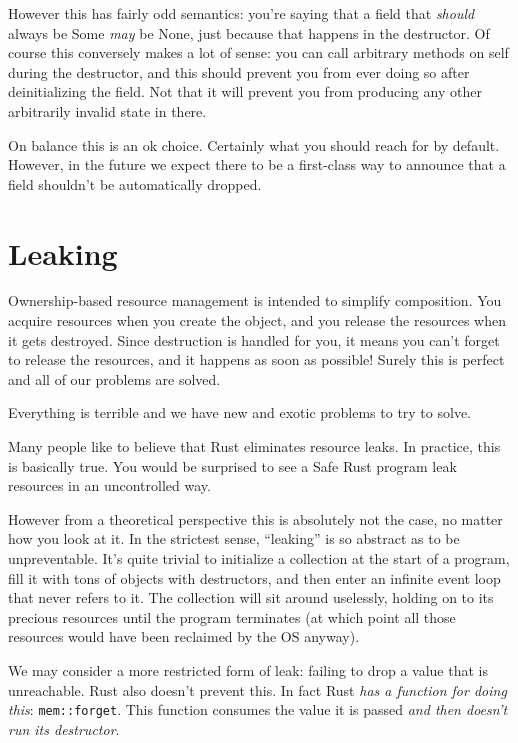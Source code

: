 \documentclass[a4paper,]{book}
\renewcommand*{\hypertarget}[3][\ar]{%
  \def\ar{#2}%
  \label{#1}%
  #3}
\begin{document}
However this has fairly odd semantics: you're saying that a field that
\emph{should} always be Some \emph{may} be None, just because that
happens in the destructor. Of course this conversely makes a lot of
sense: you can call arbitrary methods on self during the destructor, and
this should prevent you from ever doing so after deinitializing the
field. Not that it will prevent you from producing any other arbitrarily
invalid state in there.

On balance this is an ok choice. Certainly what you should reach for by
default. However, in the future we expect there to be a first-class way
to announce that a field shouldn't be automatically dropped.

\hypertarget{sec--leaking}{\section{Leaking}\label{sec--leaking}}

Ownership-based resource management is intended to simplify composition.
You acquire resources when you create the object, and you release the
resources when it gets destroyed. Since destruction is handled for you,
it means you can't forget to release the resources, and it happens as
soon as possible! Surely this is perfect and all of our problems are
solved.

Everything is terrible and we have new and exotic problems to try to
solve.

Many people like to believe that Rust eliminates resource leaks. In
practice, this is basically true. You would be surprised to see a Safe
Rust program leak resources in an uncontrolled way.

However from a theoretical perspective this is absolutely not the case,
no matter how you look at it. In the strictest sense, ``leaking'' is so
abstract as to be unpreventable. It's quite trivial to initialize a
collection at the start of a program, fill it with tons of objects with
destructors, and then enter an infinite event loop that never refers to
it. The collection will sit around uselessly, holding on to its precious
resources until the program terminates (at which point all those
resources would have been reclaimed by the OS anyway).

We may consider a more restricted form of leak: failing to drop a value
that is unreachable. Rust also doesn't prevent this. In fact Rust
\emph{has a function for doing this}: \texttt{mem::forget}. This
function consumes the value it is passed \emph{and then doesn't run its
destructor}.
\end{document}
